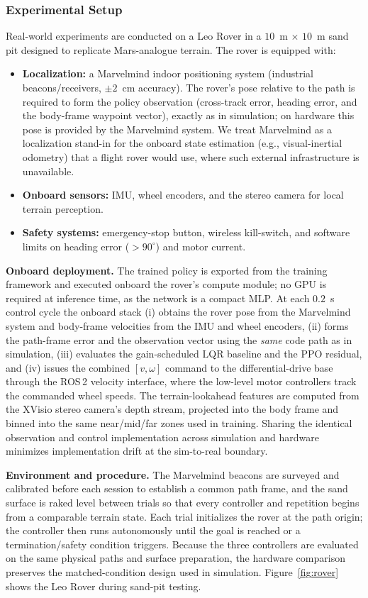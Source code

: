 \documentclass[conference]{IEEEtran}
\begin{document}
\subsubsection{Experimental Setup}
Real-world experiments are conducted on a Leo Rover in a $10$~m $\times$ $10$~m sand pit designed to replicate Mars-analogue terrain. The rover is equipped with:
\begin{itemize}
\item \textbf{Localization:} a Marvelmind indoor positioning system (industrial beacons/receivers, $\pm2$~cm accuracy). The rover's pose relative to the path is required to form the policy observation (cross-track error, heading error, and the body-frame waypoint vector), exactly as in simulation; on hardware this pose is provided by the Marvelmind system. We treat Marvelmind as a localization stand-in for the onboard state estimation (e.g., visual-inertial odometry) that a flight rover would use, where such external infrastructure is unavailable.
\item \textbf{Onboard sensors:} IMU, wheel encoders, and the stereo camera for local terrain perception.
\item \textbf{Safety systems:} emergency-stop button, wireless kill-switch, and software limits on heading error ($>90^\circ$) and motor current.
\end{itemize}

\noindent\textbf{Onboard deployment.} The trained policy is exported from the training framework and executed onboard the rover's compute module; no GPU is required at inference time, as the network is a compact MLP. At each $0.2$~s control cycle the onboard stack (i) obtains the rover pose from the Marvelmind system and body-frame velocities from the IMU and wheel encoders, (ii) forms the path-frame error and the observation vector using the \emph{same} code path as in simulation, (iii) evaluates the gain-scheduled LQR baseline and the PPO residual, and (iv) issues the combined $[v,\omega]$ command to the differential-drive base through the ROS\,2 velocity interface, where the low-level motor controllers track the commanded wheel speeds. The terrain-lookahead features are computed from the XVisio stereo camera's depth stream, projected into the body frame and binned into the same near/mid/far zones used in training. Sharing the identical observation and control implementation across simulation and hardware minimizes implementation drift at the sim-to-real boundary.

\vspace{1mm}
\noindent\textbf{Environment and procedure.} The Marvelmind beacons are surveyed and calibrated before each session to establish a common path frame, and the sand surface is raked level between trials so that every controller and repetition begins from a comparable terrain state. Each trial initializes the rover at the path origin; the controller then runs autonomously until the goal is reached or a termination/safety condition triggers. Because the three controllers are evaluated on the same physical paths and surface preparation, the hardware comparison preserves the matched-condition design used in simulation. Figure~\ref{fig:rover} shows the Leo Rover during sand-pit testing.
\end{document}
